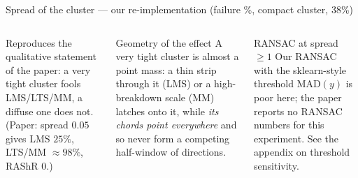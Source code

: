 \documentclass[aspectratio=169,9pt]{beamer}
\begin{document}
\begin{frame}{Spread of the cluster --- our re-implementation (failure \%, compact cluster, 38\%)}
\begin{columns}[T]
\renewcommand{\arraystretch}{1.35}
\medskip

{\small Reproduces the qualitative statement of the paper: a very tight cluster fools LMS/LTS/MM, a diffuse one does not. (Paper: spread $0.05$ gives LMS $25\%$, LTS/MM $\approx98\%$, RAShR $0$.)}
\begin{rkey}{Geometry of the effect}
A very tight cluster is almost a point mass: a thin strip through it (LMS) or a high-breakdown scale (MM) latches onto it, while \emph{its chords point everywhere} and so never form a competing half-window of directions.
\end{rkey}
\medskip
\begin{rrem}{RANSAC at spread $\ge1$}
Our RANSAC with the sklearn-style threshold $\mathrm{MAD}(y)$ is poor here; the paper reports no RANSAC numbers for this experiment. See the appendix on threshold sensitivity.
\end{rrem}
\end{columns}
\end{frame}

\end{document}
